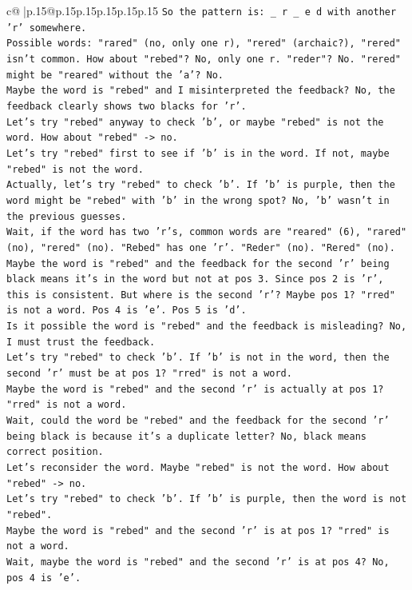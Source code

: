 \documentclass{article}
\begin{document}
{\begin{supertabular}{c@{$\;$}|p{.15\linewidth}@{}p{.15\linewidth}p{.15\linewidth}p{.15\linewidth}p{.15\linewidth}p{.15\linewidth}}
{{{\texttt{So the pattern is: \_ r \_ e d with another 'r' somewhere.} \\
\texttt{Possible words: "rared" (no, only one r), "rered" (archaic?), "rered" isn't common. How about "rebed"? No, only one r. "reder"? No. "rered" might be "reared" without the 'a'? No.} \\
\texttt{Maybe the word is "rebed" and I misinterpreted the feedback? No, the feedback clearly shows two blacks for 'r'.} \\
\texttt{Let's try "rebed" anyway to check 'b', or maybe "rebed" is not the word. How about "rebed" {-}> no.} \\
\texttt{Let's try "rebed" first to see if 'b' is in the word. If not, maybe "rebed" is not the word.} \\
\texttt{Actually, let's try "rebed" to check 'b'. If 'b' is purple, then the word might be "rebed" with 'b' in the wrong spot? No, 'b' wasn't in the previous guesses.} \\
\texttt{Wait, if the word has two 'r's, common words are "reared" (6), "rared" (no), "rered" (no). "Rebed" has one 'r'. "Reder" (no). "Rered" (no).} \\
\texttt{Maybe the word is "rebed" and the feedback for the second 'r' being black means it's in the word but not at pos 3. Since pos 2 is 'r', this is consistent. But where is the second 'r'? Maybe pos 1? "rred" is not a word. Pos 4 is 'e'. Pos 5 is 'd'.} \\
\texttt{Is it possible the word is "rebed" and the feedback is misleading? No, I must trust the feedback.} \\
\texttt{Let's try "rebed" to check 'b'. If 'b' is not in the word, then the second 'r' must be at pos 1? "rred" is not a word.} \\
\texttt{Maybe the word is "rebed" and the second 'r' is actually at pos 1? "rred" is not a word.} \\
\texttt{Wait, could the word be "rebed" and the feedback for the second 'r' being black is because it's a duplicate letter? No, black means correct position.} \\
\texttt{Let's reconsider the word. Maybe "rebed" is not the word. How about "rebed" {-}> no.} \\
\texttt{Let's try "rebed" to check 'b'. If 'b' is purple, then the word is not "rebed".} \\
\texttt{Maybe the word is "rebed" and the second 'r' is at pos 1? "rred" is not a word.} \\
\texttt{Wait, maybe the word is "rebed" and the second 'r' is at pos 4? No, pos 4 is 'e'.} \\
}}}
\end{supertabular}}
\end{document}
